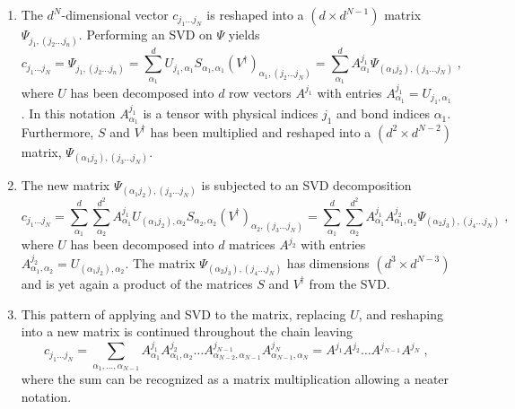 \begin{enumerate}
\item
The $d^N$-dimensional vector $c_{j_1 \ldots j_N}$ is reshaped into a $(d \times d^{N-1})$ matrix $\Psi_{j_1 , (j_2 \ldots j_n)}$. Performing an SVD on $\Psi$ yields
\begin{equation}
	c_{j_1 \ldots j_N} = \Psi_{j_1 , (j_2 \ldots j_n)} = \sum_{\alpha_1}^{d} U_{j_1 , \alpha_1} S_{\alpha_1 , \alpha_1} (V^{\dag})_{\alpha_1 , (j_2 \ldots j_N)} = \sum_{\alpha_1}^{d} A_{\alpha_1}^{j_1} \Psi_{(\alpha_1 j_2),(j_3 \ldots j_N)} \; ,
\end{equation}
where $U$ has been decomposed into $d$ row vectors $A^{j_1}$ with entries $A_{\alpha_1}^{j_1} = U_{j_1 , \alpha_1}$. In this notation $A_{\alpha_1}^{j_1}$ is a tensor with physical indices $j_1$ and bond indices $\alpha_1$. Furthermore, $S$ and $V^{\dag}$ has been multiplied and reshaped into a $(d^2 \times d^{N-2})$ matrix, $\Psi_{(\alpha_1 j_2),(j_3 \ldots j_N)}$.

\item
The new matrix $\Psi_{(\alpha_1 j_2),(j_3 \ldots j_N)}$ is subjected to an SVD decomposition
\begin{equation}
	c_{j_1 \ldots j_N} = \sum_{\alpha_1}^{d} \sum_{\alpha_2}^{d^2} A_{\alpha_1}^{j_1} U_{(\alpha_1 j_2) , \alpha_2} S_{\alpha_2 , \alpha_2} (V^{\dag})_{\alpha_2 , (j_3 \ldots j_N)} = \sum_{\alpha_1}^{d} \sum_{\alpha_2}^{d^2} A_{\alpha_1}^{j_1} A_{\alpha_1 , \alpha_2}^{j_2} \Psi_{(\alpha_2 j_3),(j_4 \ldots j_N)} \; ,
\end{equation}
where $U$ has been decomposed into $d$ matrices $A^{j_2}$ with entries $A_{\alpha_1 , \alpha_2}^{j_2} = U_{(\alpha_1 j_2) , \alpha_2}$. The matrix $\Psi_{(\alpha_2 j_3),(j_4 \ldots j_N)}$ has dimensions $(d^3 \times d^{N-3})$ and is yet again a product of the matrices $S$ and $V^{\dag}$ from the SVD.

\item
This pattern of applying and SVD to the matrix, replacing $U$, and reshaping into a new matrix is continued throughout the chain leaving 
\begin{equation}
	c_{j_1 \ldots j_N} = \sum_{\alpha_1 , \ldots , \alpha_{N-1}} A_{\alpha_1}^{j_1} A_{\alpha_1 , \alpha_2}^{j_2} \ldots A_{\alpha_{N-2} ,\alpha_{N-1}}^{j_{N-1}} A_{\alpha_{N-1} ,\alpha_{N}}^{j_{N}} = A^{j_1} A^{j_2} \ldots A^{j_{N-1}} A^{j_{N}} \; ,
\end{equation}
where the sum can be recognized as a matrix multiplication allowing a neater notation.
\end{enumerate}

